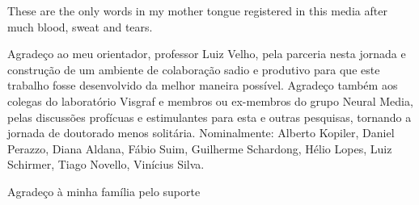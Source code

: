 These are the only words in my mother tongue registered in this media after much blood, sweat and tears.

Agradeço ao meu orientador, professor Luiz Velho, pela parceria nesta jornada e construção de um ambiente de colaboração sadio e produtivo para que este trabalho fosse desenvolvido da melhor maneira possível. Agradeço também aos colegas do laboratório Visgraf e membros ou ex-membros do grupo Neural Media, pelas discussões profícuas e estimulantes para esta e outras pesquisas, tornando a jornada de doutorado menos solitária. Nominalmente: Alberto Kopiler, Daniel Perazzo, Diana Aldana, Fábio Suim, Guilherme Schardong, Hélio Lopes, Luiz Schirmer, Tiago Novello, Vinícius Silva.

Agradeço à minha família pelo suporte 